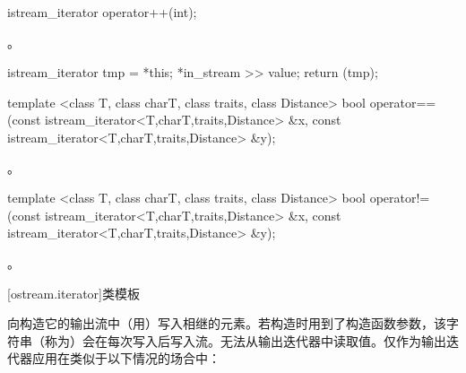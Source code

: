 %
%
\begin{itemdecl}
istream_iterator operator++(int);
\end{itemdecl}

\begin{itemdescr}
\pnum
\requires {}。

\pnum
\effects
\begin{codeblock}
istream_iterator tmp = *this;
*in_stream >> value;
return (tmp);
\end{codeblock}
\end{itemdescr}

%
%
\begin{itemdecl}
template <class T, class charT, class traits, class Distance>
  bool operator==(const istream_iterator<T,charT,traits,Distance> &x,
                  const istream_iterator<T,charT,traits,Distance> &y);
\end{itemdecl}

\begin{itemdescr}
\pnum
\returns
{}。
\end{itemdescr}

%
%
\begin{itemdecl}
template <class T, class charT, class traits, class Distance>
  bool operator!=(const istream_iterator<T,charT,traits,Distance> &x,
                  const istream_iterator<T,charT,traits,Distance> &y);
\end{itemdecl}

\begin{itemdescr}
\pnum
\returns
{}。
\end{itemdescr}

[ostream.iterator]{类模板}

\pnum
{}%
向构造它的输出流中（用）写入相继的元素。若构造时用到了构造函数参数，该字符串（称为）会在每次写入后写入流。无法从输出迭代器中读取值。仅作为输出迭代器应用在类似于以下情况的场合中：

